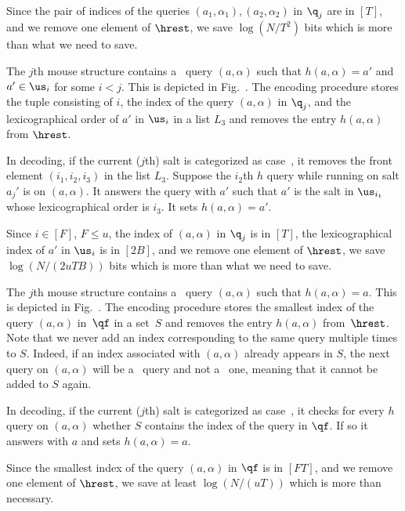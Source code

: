   Since the pair of indices of the queries $(a_1,\alpha_1),(a_2,\alpha_2)$ in $\q_j$ are in $[T]$, and we remove one element of $\hrest$, we save $\log (N/T^2)$ bits which is more than what we need to save.

The $j$th mouse structure contains a \new\ query $(a,\alpha)$ such that $h(a,\alpha)=a'$ and $a'\in \us_i$ for some $i<j$. This is depicted in Fig.~. The encoding procedure stores the tuple consisting of $i$, the index of the query $(a,\alpha)$ in $\q_j$, and the lexicographical order of $a'$ in $\us_i$ in a list $L_3$ and removes the entry $h(a,\alpha)$ from $\hrest$.

In decoding, if the current ($j$th) salt is categorized as case~, it removes the front element $(i_1,i_2,i_3)$ in the list $L_3$. Suppose the $i_2$th $h$ query while running on salt $a_j'$ is on $(a,\alpha)$. It answers the query with $a'$ such that $a'$ is the salt in $\us_{i_1}$ whose lexicographical order is $i_3$. It sets $h(a,\alpha)=a'$. 



  Since $i\in [F]$, $F\le u$, the index of $(a,\alpha)$ in $\q_j$ is in $[T]$, the lexicographical index of $a'$ in $\us_i$ is in $[2B]$, and we remove one element of $\hrest$, we save $\log (N/(2uTB))$ bits which is more than what we need to save.


The $j$th mouse structure contains a \urep\ query $(a,\alpha)$ such that $h(a,\alpha)=a$. This is depicted in Fig.~. The encoding procedure stores the smallest index of the query $(a,\alpha)$ in~$\qf$ in a set~$S$ and removes the entry $h(a,\alpha)$ from~$\hrest$.   Note that we never add an index corresponding to the same query multiple times to $S$. Indeed, if an index associated with $(a,\alpha)$ already appears in $S$, the next query on $(a,\alpha)$ will be a \frep\ query and not a \urep\ one, meaning that it cannot be added to $S$ again. 

In decoding, if the current ($j$th) salt is categorized as case~, it  checks for every $h$ query on $(a,\alpha)$ whether   $S$ contains the index of the query in $\qf$. If so it answers with $a$ and sets $h(a,\alpha)=a$.


  Since the smallest index of the query $(a,\alpha)$ in $\qf$ is in $[FT]$, and we remove one element of $\hrest$, we save at least $\log (N/(uT))$ which is more than necessary.


